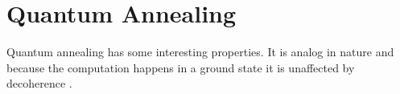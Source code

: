 \section{Quantum Annealing}
Quantum annealing has some interesting properties. It is analog in nature and because the computation happens in a ground state it is unaffected by decoherence \cite{mcgeoch2014adiabatic}. 
